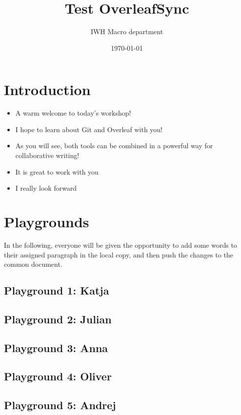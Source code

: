 \documentclass{article}
\title{Test OverleafSync}
\author{IWH Macro department}
\date{\today}
\begin{document}
\maketitle

\section{Introduction}

\begin{itemize} 
    \item A warm welcome to today's workshop!
    \item I hope to learn about Git and Overleaf with you!
    \item As you will see, both tools can be combined in a powerful way for collaborative writing!
    \item It is great to work with you
    \item I really look forward
\end{itemize}

\section{Playgrounds}
In the following, everyone will be given the opportunity to add some words to their assigned paragraph in the local copy, and then push the changes to the common document.

\subsection{Playground 1: Katja}

\subsection{Playground 2: Julian}

\subsection{Playground 3: Anna}

\subsection{Playground 4: Oliver}

\subsection{Playground 5: Andrej}
\end{document}

